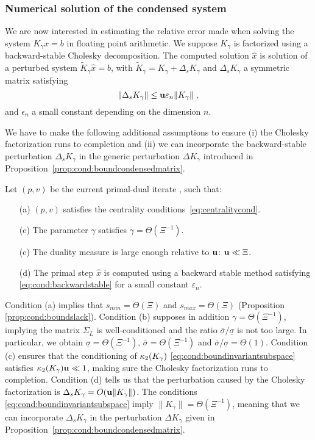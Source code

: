 \subsubsection{Numerical solution of the condensed system}
We are now interested in estimating the relative error
made when solving the system $K_\gamma x = b$ in floating
point arithmetic. We suppose $K_\gamma$ is factorized using
a backward-stable Cholesky decomposition. The computed
solution $\widehat{x}$ is solution of a perturbed system
$\widetilde{K}_\gamma \widehat{x} = b$, with $\widetilde{K}_\gamma
= K_\gamma + \Delta_s K_\gamma$ and $\Delta_s K_\gamma$
a symmetric matrix satisfying
\begin{equation}
  \label{eq:cond:backwardstable}
\|\Delta_s K_\gamma\| \leq \mathbf{u} \varepsilon_n \|K_\gamma\| \; ,
\end{equation}
and $\epsilon_n$ a small constant depending on the dimension $n$.

We have to make the following additional assumptions to
ensure (i) the Cholesky factorization runs to completion
and (ii) we can incorporate the backward-stable perturbation $\Delta_s K_\gamma$
in the generic perturbation $\Delta K_\gamma$ introduced in
Proposition~\ref{prop:cond:boundcondensedmatrix}.
\begin{assumption} Let $(p, v)$ be the current primal-dual iterate
  , such that:
  \begin{itemize}
    \item[(a)] $(p, v)$ satisfies the centrality conditions~\eqref{eq:centralitycond}.
    \item[(c)] The parameter $\gamma$ satisfies $\gamma = \Theta(\Xi^{-1})$.
    \item[(c)] The duality measure is large enough relative to $\mathbf{u}$: $\mathbf{u} \ll \Xi$.
    \item[(d)] The primal step $\widehat{x}$ is computed using a backward
      stable method satisfying \eqref{eq:cond:backwardstable} for a small constant
      $\varepsilon_n$.
  \end{itemize}
  \label{hyp:cond:wellcond}
\end{assumption}
Condition (a) implies that
$s_{min} = \Theta(\Xi)$ and $s_{max} = \Theta(\Xi)$ (Proposition \ref{prop:cond:boundslack}).
Condition (b) supposes in addition $\gamma = \Theta(\Xi^{-1})$, implying
the matrix $\Sigma_L$ is well-conditioned and
the ratio $\overline{\sigma}/\underline{\sigma}$ is not too large.
In particular, we obtain $\underline{\sigma} = \Theta(\Xi^{-1})$,
$\overline{\sigma} = \Theta(\Xi^{-1})$ and $\overline{\sigma}/\underline{\sigma} = \Theta(1)$.
Condition (c) ensures that the conditioning of $\kappa_2(K_\gamma)$
\eqref{eq:cond:boundinvariantsubspace} satisfies $\kappa_2(K_\gamma) \mathbf{u} \ll 1$,
making sure the Cholesky factorization runs to completion.
Condition (d) tells us that the perturbation caused by the Cholesky
factorization is $\Delta_s K_\gamma = O(\mathbf{u} \| K_\gamma\|)$. The
conditions \eqref{eq:cond:boundinvariantsubspace} imply $\|K_\gamma \| = \Theta(\Xi^{-1})$,
meaning that we can incorporate $\Delta_s K_\gamma$ in the perturbation
$\Delta K_\gamma$ given in Proposition~\ref{prop:cond:boundcondensedmatrix}.

